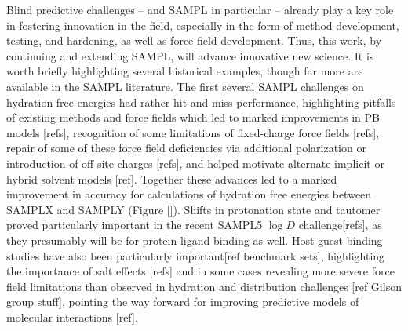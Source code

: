 \documentclass[11pt]{article}
\begin{document}
Blind predictive challenges -- and SAMPL in particular -- already play a key role in fostering innovation in the field, especially in the form of method development, testing, and hardening, as well as force field development. 
Thus, this work, by continuing and extending SAMPL, will advance innovative new science. 
It is worth briefly highlighting several historical examples, though far more are available in the SAMPL literature. 
The first several SAMPL challenges on hydration free energies had rather hit-and-miss performance, highlighting pitfalls of existing methods and force fields which led to marked improvements in PB models [refs],
 recognition of some limitations of fixed-charge force fields [refs],
repair of some of these force field deficiencies via additional polarization or introduction of off-site charges [refs],
and helped motivate alternate implicit or hybrid solvent models [ref].
Together these advances led to a marked improvement in accuracy for calculations of hydration free energies between SAMPLX and SAMPLY (Figure []).
%
%
Shifts in protonation state and tautomer proved particularly important in the recent SAMPL5 $\log D$ challenge[refs], as they presumably will be for protein-ligand binding as well.
Host-guest binding studies have also been particularly important[ref benchmark sets],
highlighting the importance of salt effects [refs]
and in some cases revealing more severe force field limitations than observed in hydration and distribution challenges [ref Gilson group stuff],
pointing the way forward for improving predictive models of molecular interactions [ref].
\end{document}
